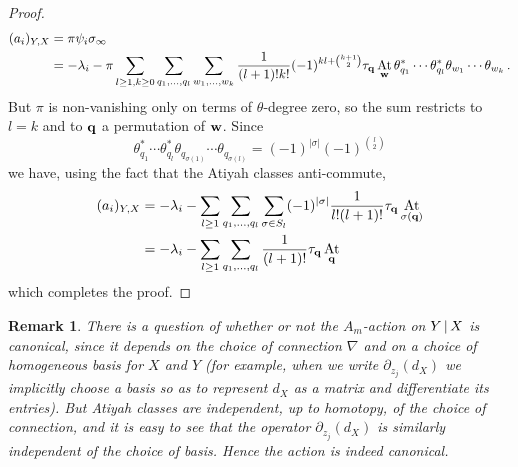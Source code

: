 \documentclass[english,letter paper,12pt,leqno]{article}
\theoremstyle{example}
\newtheorem{remark}[theorem]{Remark}
\numberwithin{equation}{section}
\DeclareMathOperator{\At}{At}
\begin{document}
\begin{proof}
\begin{align*}
(a_i)_{Y,X} &= \pi \psi_i \sigma_\infty\\
&= - \lambda_i - \pi \sum_{l \ge 1, k \ge 0} \sum_{q_1,\ldots,q_l} \sum_{w_1,\ldots,w_k} \frac{1}{(l+1)! k!} (-1)^{kl+\binom{k+1}{2}} \tau_{\bold{q}}  \At_{\bold{w}} \theta_{q_1}^* \cdots \theta_{q_l}^* \theta_{w_1} \cdots \theta_{w_k}\,.
\end{align*}
But $\pi$ is non-vanishing only on terms of $\theta$-degree zero, so the sum restricts to $l = k$ and to $\bold{q}$ a permutation of $\bold{w}$. Since
\[
\theta_{q_1}^* \cdots \theta_{q_l}^* \theta_{q_{\sigma(1)}} \cdots \theta_{q_{\sigma(l)}} = (-1)^{|\sigma|} (-1)^{\binom{l}{2}}
\]
we have, using the fact that the Atiyah classes anti-commute,
\begin{align*}
(a_i)_{Y,X} &= - \lambda_i - \sum_{l \ge 1} \sum_{q_1,\ldots,q_l} \sum_{\sigma \in S_l} (-1)^{|\sigma|} \frac{1}{l! (l+1)!} \tau_{\bold{q}} \At_{\sigma(\bold{q})}\\
&= - \lambda_i - \sum_{l \ge 1} \sum_{q_1,\ldots,q_l} \frac{1}{(l+1)!} \tau_{\bold{q}} \At_{\bold{q}}
\end{align*}
which completes the proof.
\end{proof}


\begin{remark} There is a question of whether or not the $A_m$-action on $Y \,|\, X$ is canonical, since it depends on the choice of connection $\nabla$ and on a choice of homogeneous basis for $X$ and $Y$ (for example, when we write $\partial_{z_j}(d_X)$ we implicitly choose a basis so as to represent $d_X$ as a matrix and differentiate its entries). But Atiyah classes are independent, up to homotopy, of the choice of connection, and it is easy to see that the operator $\partial_{z_j}(d_X)$ is similarly independent of the choice of basis. Hence the action is indeed canonical.
\end{remark}
\end{document}
